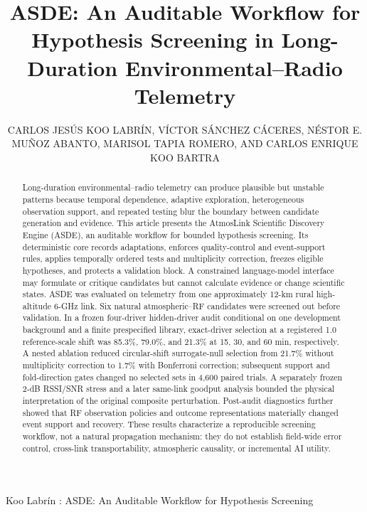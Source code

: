 \documentclass{ieeeaccess}
\begin{document}
\title{ASDE: An Auditable Workflow for Hypothesis Screening in Long-Duration Environmental--Radio Telemetry}
\author{\uppercase{Carlos Jes\'us Koo Labr\'in},
\uppercase{V\'ictor S\'anchez C\'aceres},
\uppercase{N\'estor E. Mu\~noz Abanto},
\uppercase{Marisol Tapia Romero}, AND
\uppercase{Carlos Enrique Koo Bartra}}
\address[1]{Universidad Nacional de Cajamarca, Cajamarca, Peru (e-mail: ckoo@unc.edu.pe)}
\address[2]{Universidad Privada del Norte, Trujillo, Peru}
{Koo Labr\'in \headeretal: ASDE: An Auditable Workflow for Hypothesis Screening}

\begin{abstract}
Long-duration environmental--radio telemetry can produce plausible but unstable patterns because temporal dependence, adaptive exploration, heterogeneous observation support, and repeated testing blur the boundary between candidate generation and evidence. This article presents the AtmosLink Scientific Discovery Engine (ASDE), an auditable workflow for bounded hypothesis screening. Its deterministic core records adaptations, enforces quality-control and event-support rules, applies temporally ordered tests and multiplicity correction, freezes eligible hypotheses, and protects a validation block. A constrained language-model interface may formulate or critique candidates but cannot calculate evidence or change scientific states. ASDE was evaluated on telemetry from one approximately 12-km rural high-altitude 6-GHz link. Six natural atmospheric--RF candidates were screened out before validation. In a frozen four-driver hidden-driver audit conditional on one development background and a finite prespecified library, exact-driver selection at a registered 1.0 reference-scale shift was 85.3\%, 79.0\%, and 21.3\% at 15, 30, and 60 min, respectively. A nested ablation reduced circular-shift surrogate-null selection from 21.7\% without multiplicity correction to 1.7\% with Bonferroni correction; subsequent support and fold-direction gates changed no selected sets in 4,600 paired trials. A separately frozen 2-dB RSSI/SNR stress and a later same-link goodput analysis bounded the physical interpretation of the original composite perturbation. Post-audit diagnostics further showed that RF observation policies and outcome representations materially changed event support and recovery. These results characterize a reproducible screening workflow, not a natural propagation mechanism: they do not establish field-wide error control, cross-link transportability, atmospheric causality, or incremental AI utility.
\end{abstract}
\end{document}
